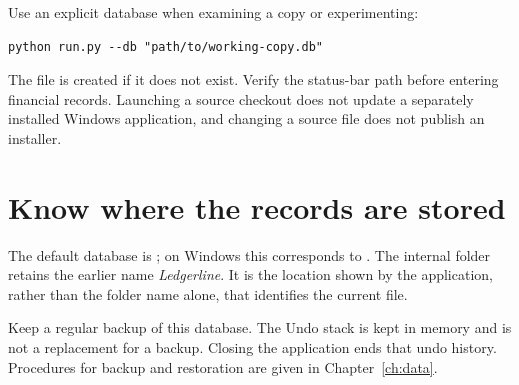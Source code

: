 Use an explicit database when examining a copy or experimenting:
\begin{lstlisting}
python run.py --db "path/to/working-copy.db"
\end{lstlisting}
The file is created if it does not exist. Verify the status-bar path before entering financial records. Launching a source checkout does not update a separately installed Windows application, and changing a source file does not publish an installer.

\section{Know where the records are stored}
The default database is ; on Windows this corresponds to . The internal folder retains the earlier name \emph{Ledgerline}. It is the location shown by the application, rather than the folder name alone, that identifies the current file.

Keep a regular backup of this database. The Undo stack is kept in memory and is not a replacement for a backup. Closing the application ends that undo history. Procedures for backup and restoration are given in Chapter~\ref{ch:data}.


